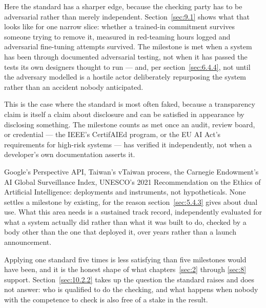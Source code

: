 Here the standard has a sharper edge, because the checking party has to be adversarial rather than merely independent. Section~\ref{sec:9.1} shows what that looks like for one narrow slice: whether a trained-in commitment survives someone trying to remove it, measured in red-teaming hours logged and adversarial fine-tuning attempts survived. The milestone is met when a system has been through documented adversarial testing, not when it has passed the tests its own designers thought to run — and, per section~\ref{sec:6.4.4}, not until the adversary modelled is a hostile actor deliberately repurposing the system rather than an accident nobody anticipated.

This is the case where the standard is most often faked, because a transparency claim is itself a claim about disclosure and can be satisfied in appearance by disclosing something. The milestone counts as met once an audit, review board, or credential — the IEEE's CertifAIEd program, or the EU AI Act's requirements for high-risk systems — has verified it independently, not when a developer's own documentation asserts it.

Google's Perspective API, Taiwan's vTaiwan process, the Carnegie Endowment's AI Global Surveillance Index, UNESCO's 2021 Recommendation on the Ethics of Artificial Intelligence: deployments and instruments, not hypotheticals. None settles a milestone by existing, for the reason section~\ref{sec:5.4.3} gives about dual use. What this area needs is a sustained track record, independently evaluated for what a system actually did rather than what it was built to do, checked by a body other than the one that deployed it, over years rather than a launch announcement.

Applying one standard five times is less satisfying than five milestones would have been, and it is the honest shape of what chapters~\ref{sec:2} through \ref{sec:8} support. Section~\ref{sec:10.2.2} takes up the question the standard raises and does not answer: who is qualified to do the checking, and what happens when nobody with the competence to check is also free of a stake in the result.
